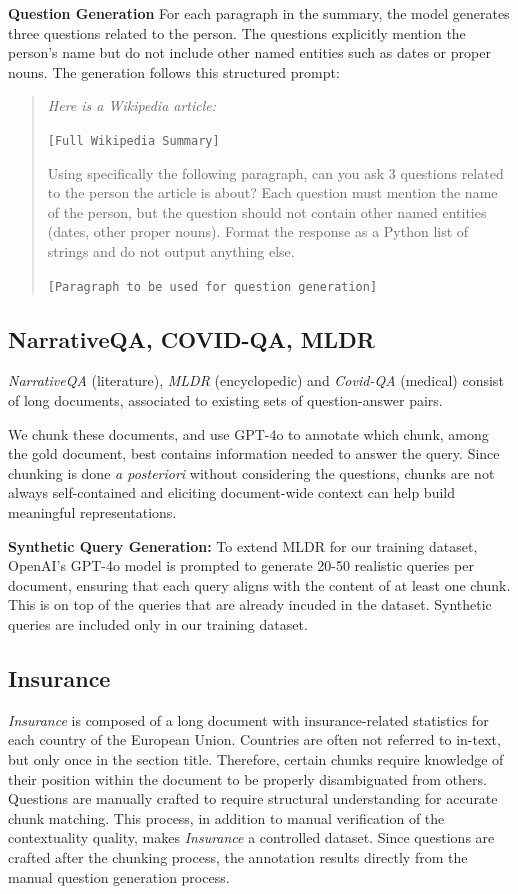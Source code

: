 \noindent\textbf{Question Generation}
For each paragraph in the summary, the model generates three questions related to the person. The questions explicitly mention the person's name but do not include other named entities such as dates or proper nouns. The generation follows this structured prompt:

\begin{quote}
\textit{
Here is a Wikipedia article:}

\texttt{[Full Wikipedia Summary]}

Using specifically the following paragraph, can you ask 3 questions related to the person the article is about? Each question must mention the name of the person, but the question should not contain other named entities (dates, other proper nouns). Format the response as a Python list of strings and do not output anything else.

\texttt{[Paragraph to be used for question generation]}

\end{quote}


\subsection{NarrativeQA, COVID-QA, MLDR}

\textit{NarrativeQA} (literature), \textit{MLDR} (encyclopedic) and \textit{Covid-QA} (medical) consist of long documents, associated to existing sets of question-answer pairs. 

We chunk these documents, and use GPT-4o to annotate which chunk, among the gold document, best contains information needed to answer the query. Since chunking is done \textit{a posteriori} without considering the questions, chunks are not always self-contained and eliciting document-wide context can help build meaningful representations. 

\textbf{Synthetic Query Generation:} To extend MLDR for our training dataset, OpenAI's GPT-4o model is prompted to generate 20-50 realistic queries per document, ensuring that each query aligns with the content of at least one chunk. This is on top of the queries that are already incuded in the dataset. Synthetic queries are included only in our training dataset.


\subsection{Insurance} 
\textit{Insurance} is composed of a long document with insurance-related statistics for each country of the European Union. Countries are often not referred to in-text, but only once in the section title. Therefore, certain chunks require knowledge of their position within the document to be properly disambiguated from others. Questions are manually crafted to require structural understanding for accurate chunk matching. This process, in addition to manual verification of the contextuality quality, makes \textit{Insurance} a controlled dataset. Since questions are crafted after the chunking process, the annotation results directly from the manual question generation process.

